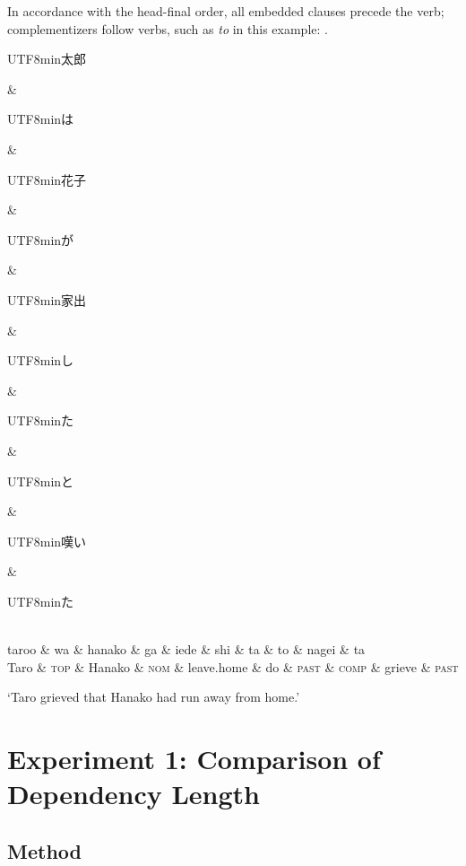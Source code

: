 \documentclass[11pt,a4paper]{article}
\newcommand{\japanese}[1]{\begin{CJK}{UTF8}{min}#1\end{CJK}}
\begin{document}
In accordance with the head-final order, all embedded clauses precede the verb; complementizers follow verbs, such as \textit{to} in this example:
\ex.
\begin{dependency}[theme = simple]
   \begin{deptext}[column sep=1em]
\japanese{太郎} \& \japanese{は} \& \japanese{花子} \& \japanese{が} \& \japanese{家出} \& \japanese{し} \& \japanese{た} \& \japanese{と} \& \japanese{嘆い} \& \japanese{た} \\
          taroo \& wa \& hanako \& ga \& iede \& shi \& ta \& to \& nagei \& ta \\ 
          Taro \& \textsc{top} \& Hanako \& \textsc{nom} \& leave.home \& do \& \textsc{past} \& \textsc{comp} \& grieve \& \textsc{past} \\
   \end{deptext}
\end{dependency}
`Taro grieved that Hanako had run away from home.' \citep[p. 224]{iwasaki2013japanese}\label{ex:hanako-ran}



\section{Experiment 1: Comparison of Dependency Length}

\subsection{Method}
\end{document}
